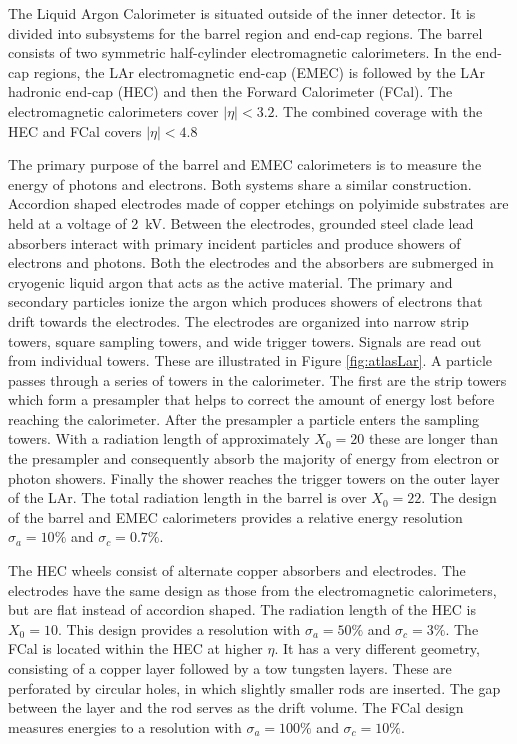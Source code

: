 The Liquid Argon Calorimeter is situated outside of the inner detector.
It is divided into subsystems for the barrel region and end-cap regions.
The barrel consists of two symmetric half-cylinder electromagnetic calorimeters.
In the end-cap regions, the LAr electromagnetic end-cap (EMEC) is followed by the LAr hadronic end-cap (HEC) and then the Forward Calorimeter (FCal).
The electromagnetic calorimeters cover $|\eta|<3.2$.
The combined coverage with the HEC and FCal covers $|\eta|<4.8$

The primary purpose of the barrel and EMEC calorimeters is to measure the energy of photons and electrons.
Both systems share a similar construction.
Accordion shaped electrodes made of copper etchings on polyimide substrates are held at a voltage of 2~kV.
Between the electrodes, grounded steel clade lead absorbers interact with primary incident particles and produce showers of electrons and photons.
Both the electrodes and the absorbers are submerged in cryogenic liquid argon that acts as the active material.
The primary and secondary particles ionize the argon which produces showers of electrons that drift towards the electrodes.
The electrodes are organized into narrow strip towers, square sampling towers, and wide trigger towers.
Signals are read out from individual towers.
These are illustrated in Figure \ref{fig:atlasLar}.
A particle passes through a series of towers in the calorimeter.
The first are the strip towers which form a presampler that helps to correct the amount of energy lost before reaching the calorimeter.
After the presampler a particle enters the sampling towers.
With a radiation length of approximately $X_0=20$ these are longer than the presampler and consequently absorb the majority of energy from electron or photon showers.
Finally the shower reaches the trigger towers on the outer layer of the LAr.
The total radiation length in the barrel is over $X_0=22$.
The design of the barrel and EMEC calorimeters provides a relative energy resolution $\sigma_a=10\%$ and $\sigma_c=0.7\%$.
\cite{lar}

The HEC wheels consist of alternate copper absorbers and electrodes.
The electrodes have the same design as those from the electromagnetic calorimeters, but are flat instead of accordion shaped.
The radiation length of the HEC is $X_0=10$.
This design provides a resolution with $\sigma_a=50\%$ and $\sigma_c=3\%$.
The FCal is located within the HEC at higher $\eta$.
It has a very different geometry, consisting of a copper layer followed by a tow tungsten layers. 
These are perforated by circular holes, in which slightly smaller rods are inserted.
The gap between the layer and the rod serves as the drift volume.
The FCal design measures energies to a resolution with $\sigma_a=100\%$ and $\sigma_c=10\%$.
\cite{lar}

